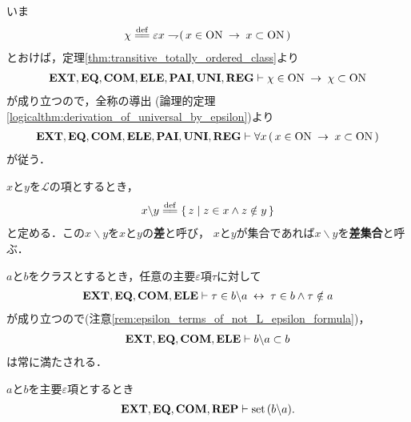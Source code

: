 	\begin{prf}
		いま
		\begin{align}
			\chi \defeq \varepsilon x \negation 
			(\, x \in \ON \rarrow x \subset \ON\, )
		\end{align}
		とおけば，定理\ref{thm:transitive_totally_ordered_class}より
		\begin{align}
			\mbox{{\bf EXT}},\mbox{{\bf EQ}},\mbox{\bf COM},\mbox{{\bf ELE}},\mbox{{\bf PAI}},\mbox{{\bf UNI}},\mbox{{\bf REG}} \vdash 
			\chi \in \mathrm{ON} \hspace{0.25em}\rightarrow\hspace{0.25em} \chi \subset \mathrm{ON}
		\end{align}
		が成り立つので，全称の導出
		(論理的定理\ref{logicalthm:derivation_of_universal_by_epsilon})より
		\begin{align}
			\mbox{{\bf EXT}},\mbox{{\bf EQ}},\mbox{\bf COM},\mbox{{\bf ELE}},\mbox{{\bf PAI}},\mbox{{\bf UNI}},\mbox{{\bf REG}} \vdash 
			\forall x\, (\, x \in \mathrm{ON} \hspace{0.25em}\rightarrow\hspace{0.25em} x \subset \mathrm{ON}\, )
		\end{align}
		が従う．
		\QED
	\end{prf}
	
	\begin{screen}
		\begin{dfn}[クラスの差]
			$x$と$y$を$\mathcal{L}$の項とするとき，
			\begin{align}
				x \backslash y \defeq \Set{z}{z \in x \wedge z \notin y}
			\end{align}
			と定める．この$x \backslash y$を$x$と$y$の{\bf 差}と呼び，
			$x$と$y$が集合であれば$x \backslash y$を{\bf 差集合}と呼ぶ．
		\end{dfn}
	\end{screen}
	
	$a$と$b$をクラスとするとき，任意の主要$\varepsilon$項$\tau$に対して
	\begin{align}
		\mbox{{\bf EXT}},\mbox{{\bf EQ}},\mbox{\bf COM},\mbox{{\bf ELE}} \vdash \tau \in b \backslash a \hspace{0.25em}\leftrightarrow\hspace{0.25em} \tau \in b \wedge \tau \notin a
	\end{align}
	が成り立つので(注意\ref{rem:epsilon_terms_of_not_L_epsilon_formula})，
	\begin{align}
		\mbox{{\bf EXT}},\mbox{{\bf EQ}},\mbox{\bf COM},\mbox{{\bf ELE}} \vdash b \backslash a \subset b
	\end{align}
	は常に満たされる．
	
	\begin{screen}
		\begin{thm}[差集合は集合]\label{thm:set_difference_is_set}
			$a$と$b$を主要$\varepsilon$項とするとき
			\begin{align}
				\mbox{{\bf EXT}},\mbox{{\bf EQ}},\mbox{\bf COM},\mbox{{\bf REP}} \vdash \operatorname*{set}\hspace{0.15em}(b \backslash a).
			\end{align}
		\end{thm}
	\end{screen}
	
